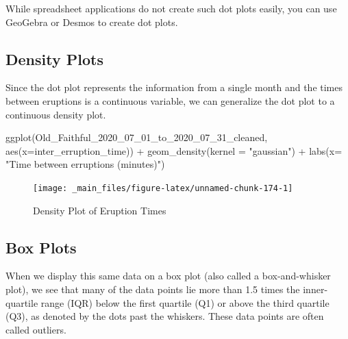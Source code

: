 \documentclass[
]{book}
\newenvironment{Shaded}{\begin{snugshade}}{\end{snugshade}}
\newcommand{\AttributeTok}[1]{\textcolor[rgb]{0.77,0.63,0.00}{#1}}
\newcommand{\FunctionTok}[1]{\textcolor[rgb]{0.00,0.00,0.00}{#1}}
\newcommand{\NormalTok}[1]{#1}
\newcommand{\SpecialCharTok}[1]{\textcolor[rgb]{0.00,0.00,0.00}{#1}}
\newcommand{\StringTok}[1]{\textcolor[rgb]{0.31,0.60,0.02}{#1}}
\theoremstyle{definition}
\theoremstyle{definition}
\theoremstyle{definition}
\theoremstyle{definition}
\theoremstyle{remark}
\begin{document}
While spreadsheet applications do not create such dot plots easily, you can use GeoGebra or Desmos to create dot plots.

\hypertarget{density-plots}{%
\subsection{Density Plots}\label{density-plots}}

Since the dot plot represents the information from a single month and the times between eruptions is a continuous variable, we can generalize the dot plot to a continuous density plot.

\begin{Shaded}
\begin{Highlighting}[]
\FunctionTok{ggplot}\NormalTok{(Old\_Faithful\_2020\_07\_01\_to\_2020\_07\_31\_cleaned, }\FunctionTok{aes}\NormalTok{(}\AttributeTok{x=}\NormalTok{inter\_erruption\_time)) }\SpecialCharTok{+} \FunctionTok{geom\_density}\NormalTok{(}\AttributeTok{kernel =} \StringTok{"gaussian"}\NormalTok{) }\SpecialCharTok{+} \FunctionTok{labs}\NormalTok{(}\AttributeTok{x=} \StringTok{"Time between erruptions (minutes)"}\NormalTok{)}
\end{Highlighting}
\end{Shaded}

\begin{figure}

{\centering \texttt{[image: \_main\_files/figure-latex/unnamed-chunk-174-1]} 

}

\caption{Density Plot of Eruption Times}\label{fig:unnamed-chunk-174}
\end{figure}

\hypertarget{box-plots}{%
\subsection{Box Plots}\label{box-plots}}

When we display this same data on a box plot (also called a box-and-whisker plot), we see that many of the data points lie more than 1.5 times the inner-quartile range (IQR) below the first quartile (Q1) or above the third quartile (Q3), as denoted by the dots past the whiskers. These data points are often called outliers.
\end{document}
